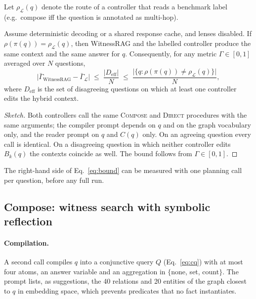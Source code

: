 Let $\rho_{\mathcal{L}}(q)$ denote the route of a controller that reads a
benchmark label (e.g.\ compose iff the question is annotated as multi-hop).

\begin{proposition}\label{prop:equivalence}
Assume deterministic decoding or a shared response cache, and lenses disabled.
If $\rho(\pi(q))=\rho_{\mathcal{L}}(q)$, then WitnessRAG and the labelled
controller produce the same context and the same answer for $q$. Consequently,
for any metric $\Gamma\in[0,1]$ averaged over $N$ questions,
\begin{equation}
  \bigl|\bar\Gamma_{\text{WitnessRAG}}-\bar\Gamma_{\mathcal{L}}\bigr|
  \;\le\; \frac{|D_{\text{eff}}|}{N}
  \;\le\; \frac{\bigl|\{q:\rho(\pi(q))\neq\rho_{\mathcal{L}}(q)\}\bigr|}{N},
  \label{eq:bound}
\end{equation}
where $D_{\text{eff}}$ is the set of disagreeing questions on which at least one
controller edits the hybrid context.
\end{proposition}
\begin{proof}[Sketch]
Both controllers call the same \textsc{Compose} and \textsc{Direct} procedures
with the same arguments; the compiler prompt depends on $q$ and on the graph
vocabulary only, and the reader prompt on $q$ and $C(q)$ only. On an agreeing
question every call is identical. On a disagreeing question in which neither
controller edits $B_k(q)$ the contexts coincide as well. The bound follows
from $\Gamma\in[0,1]$.
\end{proof}

The right-hand side of Eq.~\ref{eq:bound} can be measured with one planning
call per question, before any full run.

\subsection{Compose: witness search with symbolic reflection}\label{sec:compose}

\paragraph{Compilation.}
A second call compiles $q$ into a conjunctive query $Q$ (Eq.~\ref{eq:cq}) with
at most four atoms, an answer variable and an aggregation in
$\{$none, set, count$\}$. The prompt lists, as suggestions, the 40 relations
and 20 entities of the graph closest to $q$ in embedding space, which prevents
predicates that no fact instantiates.

